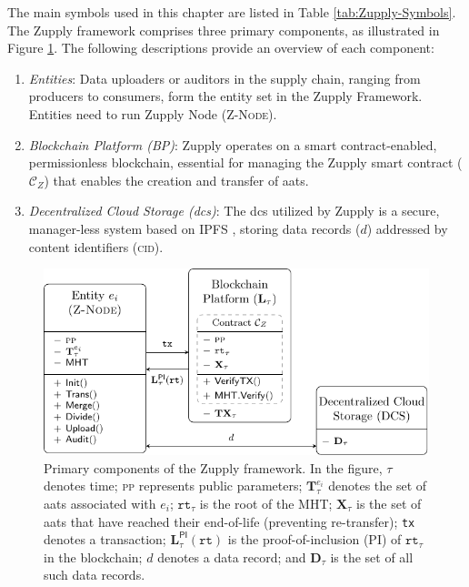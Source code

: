 The main symbols used in this chapter are listed in Table \ref{tab:Zupply-Symbols}. 
The Zupply framework comprises three primary components, as illustrated in Figure \ref{fig:Zupply-Architecture}. The following descriptions provide an overview of each component:

\begin{enumerate}
    \item \textit{Entities}: Data uploaders or auditors in the supply chain, ranging from producers to consumers, form the entity set in the Zupply Framework. Entities need to run Zupply Node (\textsc{Z-Node}).  %

    \item \textit{Blockchain Platform (BP)}: Zupply operates on a smart contract-enabled, permissionless blockchain, essential for managing the Zupply smart contract ($\mathcal{C}_Z$) that enables the creation and transfer of \gls{aat}s. 

    \item \textit{Decentralized Cloud Storage (\gls{dcs})}: The \gls{dcs} utilized by Zupply is a secure, manager-less system based on IPFS \cite{Benet2014}, storing data records ($d$) addressed by content identifiers (\textsc{cid}). 
    
\end{enumerate}

\begin{figure}
    \centering
    \includegraphics[width=0.8\linewidth]{Figures/Architecture}
    \caption[Primary components of the Zupply framework]{Primary components of the Zupply framework. In the figure, $\tau$ denotes time; \textsc{pp} represents public parameters; $\mathbf{T}_\tau^{e_i}$ denotes the set of \gls{aat}s associated with $e_i$; $\texttt{rt}_\tau$ is the root of the \textsf{MHT}; $\mathbf{X}_\tau$ is the set of \gls{aat}s that have reached their end-of-life (preventing re-transfer); \texttt{tx} denotes a transaction; $\mathbf{L}_\tau^\mathsf{PI}(\texttt{rt})$ is the proof-of-inclusion (PI) of $\texttt{rt}_\tau$ in the blockchain; $d$ denotes a data record; and $\mathbf{D}_\tau$ is the set of all such data records.}
    \label{fig:Zupply-Architecture}
\end{figure}

